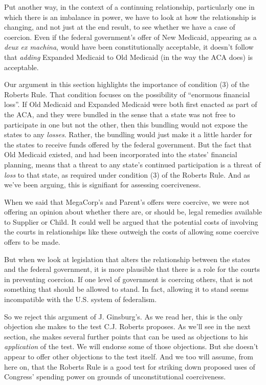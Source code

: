 \documentclass[
  11pt,
  letterpaper,
  DIV=11,
  numbers=noendperiod,
  twoside]{scrartcl}
\begin{document}
Put another way, in the context of a continuing relationship,
particularly one in which there is an imbalance in power, we have to
look at how the relationship is changing, and not just at the end
result, to see whether we have a case of coercion. Even if the federal
government's offer of New Medicaid, appearing as a \emph{deux ex
machina}, would have been constitutionally acceptable, it doesn't follow
that \emph{adding} Expanded Medicaid to Old Medicaid (in the way the ACA
does) is acceptable.

Our argument in this section highlights the importance of condition (3)
of the Roberts Rule. That condition focuses on the possibility of
``enormous financial loss''. If Old Medicaid and Expanded Medicaid were
both first enacted as part of the ACA, and they were bundled in the
sense that a state was not free to participate in one but not the other,
then this bundling would not expose the states to any \emph{losses}.
Rather, the bundling would just make it a little harder for the states
to receive funds offered by the federal government. But the fact that
Old Medicaid existed, and had been incorporated into the states'
financial planning, means that a threat to any state's continued
participation is a threat of \emph{loss} to that state, as required
under condition (3) of the Roberts Rule. And as we've been arguing, this
is signifiant for assessing coerciveness.

When we said that MegaCorp's and Parent's offers were coercive, we were
not offering an opinion about whether there are, or should be, legal
remedies available to Supplier or Child. It could well be argued that
the potential costs of involving the courts in relationships like these
outweigh the costs of allowing some coercive offers to be made.

But when we look at legislation that alters the relationship between the
states and the federal government, it is more plausible that there is a
role for the courts in preventing coercion. If one level of government
is coercing others, that is not something that should be allowed to
stand. In fact, allowing it to stand seems incompatible with the U.S.
system of federalism.

So we reject this argument of J. Ginsburg's. As we read her, this is the
only objection she makes to the test C.J. Roberts proposes. As we'll see
in the next section, she makes several further points that can be used
as objections to his \emph{application} of the test. We will endorse
some of those objections. But she doesn't appear to offer other
objections to the test itself. And we too will assume, from here on,
that the Roberts Rule is a good test for striking down proposed uses of
Congress' spending power on grounds of unconstitutional coerciveness.
\end{document}
